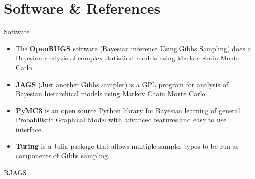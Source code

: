 \documentclass[
  ignorenonframetext,
]{beamer}
\begin{document}
\hypertarget{software-references}{%
\section{Software \& References}\label{software-references}}

\begin{frame}{Software}
\protect\hypertarget{software}{}

\begin{itemize}
  \item The \textbf{OpenBUGS} software (Bayesian inference Using Gibbs Sampling) does a Bayesian analysis of complex statistical models using Markov chain Monte Carlo.

   \item  \textbf{JAGS} (Just another Gibbs sampler) is a GPL program for analysis of Bayesian hierarchical models using Markov Chain Monte Carlo.

  \item \textbf{PyMC3} is an open source Python library for Bayesian learning of general Probabilistic Graphical Model with advanced features and easy to use interface.

  \item \textbf{Turing} is a Julia package that allows multiple sampler types to be run as components of Gibbs sampling. 

\end{itemize}

\end{frame}

\begin{frame}{RJAGS}
\protect\hypertarget{rjags}{}

\end{frame}
\end{document}
